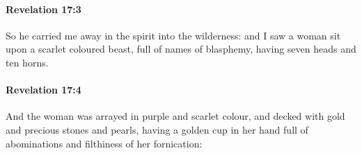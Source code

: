 		\paragraph{Revelation 17:3} %
			\label{REVELATIONNT-17-3}

			So he carried me away in the spirit into the wilderness: and I saw a woman sit upon a scarlet coloured beast, full of names of blasphemy, having seven heads and ten horns.

			\begin{framed}
			\scriptsize
				\begin{compactdesc}
					\item[SBLG] 
				\end{compactdesc}
			\end{framed}

		\paragraph{Revelation 17:4} %
			\label{REVELATIONNT-17-4}

			And the woman was arrayed in purple and scarlet colour, and decked with gold and precious stones and pearls, having a golden cup in her hand full of abominations and filthiness of her fornication:

